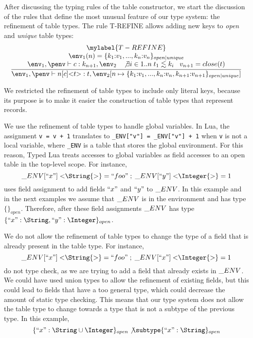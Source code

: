 After discussing the typing rules of the table constructor,
we start the discussion of the rules that define the most
unusual feature of our type system: the refinement of table types.
The rule \textsc{T-REFINE} allows adding new keys to \emph{open}
and \emph{unique} table types:
\[
\begin{array}{c}
\mylabel{T-REFINE}\\
\dfrac{\begin{array}{c}
       \env_{1}(n) = \{ k_{1}{:}v_{1}, ..., k_{n}{:}v_{n} \}_{open|unique}\\
       \env_{1}, \penv \vdash c:k_{n+1}, \env_{2} \;\;\;
       \not \exists i \in 1..n \; t_{1} \lesssim k_{i} \;\;\;
       v_{n+1} = close(t)
       \end{array}}
      {\env_{1}, \penv \vdash n[c] {<}t{>}:t, \env_{2}[n \mapsto \{ k_{1}{:}v_{1}, ..., k_{n}{:}v_{n}, k_{n+1}{:}v_{n+1}\}_{open|unique}]}
\end{array}
\]

We restricted the refinement of table types to include only literal
keys, because its purpose is to make it easier the construction of
table types that represent records.

We use the refinement of table types to handle global variables.
In Lua, the assignment \texttt{v = v + 1} translates to
\texttt{\string_ENV["v"] = \string_ENV["v"] + 1} when \texttt{v}
is not a local variable, where \texttt{\string_ENV} is a table
that stores the global environment.
For this reason, Typed Lua treats accesses to global variables as field accesses
to an open table in the top-level scope.
For instance,
\[
\string_ENV[``x"] \; {<}\String{>} = ``foo" \;;\; \string_ENV[``y"] \; {<}\Integer{>} = 1
\]
uses field assignment to add fields $``x"$ and $``y"$ to $\string_ENV$.
In this example and in the next examples we assume that
$\string_ENV$ is in the environment and has type $\{\}_{open}$.
Therefore, after these field assignments $\string_ENV$ has type
$\{``x":\String, ``y":\Integer\}_{open}$.

We do not allow the refinement of table types to change the type of
a field that is already present in the table type.
For instance,
\[
\string_ENV[``x"] \; {<}\String{>} = ``foo" \;;\; \string_ENV[``x"] \; {<}\Integer{>} = 1
\]
do not type check, as we are trying to add a field that already exists
in $\string_ENV$.
We could have used union types to allow the refinement of existing fields,
but this could lead to fields that have a too general type, which could
decrease the amount of static type checking.
This means that our type system does not allow the table type to change
towards a type that is not a subtype of the previous type.
In this example,
\[
\{``x":\String \cup \Integer\}_{open} \not\subtype \{``x":\String\}_{open}
\]

